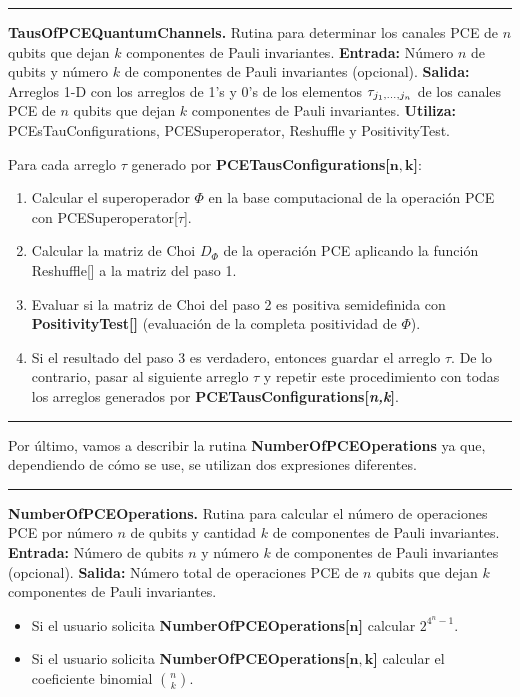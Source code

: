 \noindent\rule{\textwidth}{1mm}
\textbf{TausOfPCEQuantumChannels.} Rutina para determinar los 
canales PCE de $n$ qubits que dejan $k$ componentes de Pauli
invariantes. \textbf{Entrada:} Número $n$ de 
qubits y número $k$ de componentes de Pauli invariantes (opcional). 
\textbf{Salida:} Arreglos 1-D con los 
arreglos de 1's y 0's de los elementos $\tau_{j_1,\ldots ,j_n}$ de 
los canales PCE de $n$ qubits que dejan $k$ componentes de Pauli 
invariantes.  
\textbf{Utiliza:} PCEsTauConfigurations, PCESuperoperator, Reshuffle 
y PositivityTest.

Para cada arreglo $\tau$ generado por 
\textbf{PCETausConfigurations[$\boldsymbol{n,k}$]}:
\begin{enumerate}
	\item Calcular el superoperador $\Phi$ en la base computacional
	de la operación PCE con PCESuperoperator[$\tau$].
	\item Calcular la matriz de Choi $D_{\Phi}$ de la operación PCE 
	aplicando la función Reshuffle[] a la matriz del paso 1.
	\item Evaluar si la matriz de Choi del paso 2 es positiva semidefinida con
	\textbf{PositivityTest[]} (evaluación de la completa positividad 
	de $\Phi$).
	\item Si el resultado del paso 3 es verdadero, entonces guardar 
	el arreglo $\tau$. De lo contrario, pasar al siguiente 
	arreglo $\tau$ y repetir este procedimiento con todas 
	los arreglos generados por \textbf{PCETausConfigurations[\textit{n,k}]}. 
\end{enumerate}

\noindent\rule{\textwidth}{1mm}

Por último, vamos a describir la rutina \textbf{NumberOfPCEOperations}
ya que, dependiendo de cómo se use, se utilizan dos expresiones 
diferentes. 

\noindent\rule{\textwidth}{1mm}
\textbf{NumberOfPCEOperations.} Rutina para calcular el número de 
operaciones PCE por número $n$ de qubits y cantidad $k$ de componentes
de Pauli invariantes. \textbf{Entrada:} Número de 
qubits $n$ y número $k$ de componentes de Pauli invariantes (opcional). 
\textbf{Salida:} Número total de operaciones PCE de $n$ qubits 
que dejan $k$ componentes de Pauli invariantes.

\begin{itemize}
	\item Si el usuario solicita 
	\textbf{NumberOfPCEOperations[$\boldsymbol{n}$]}
	calcular $2^{4^n-1}$.
	\item Si el usuario solicita 
	\textbf{NumberOfPCEOperations[$\boldsymbol{n,k}$]} 
	calcular el coeficiente binomial $\binom{n}{k}$.
\end{itemize}

